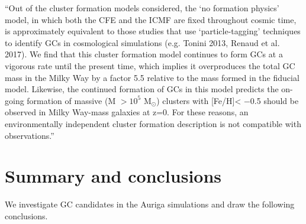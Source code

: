 \documentclass[a4paper,fleqn,usenatbib]{mnras}
\newcommand{\Sun}[0]{\ensuremath{_{\odot}}}
\begin{document}
%
%
%


\citep{2019MNRAS.486.5838R}
``Out of the cluster formation models considered, the `no formation physics' model,
in which both the CFE and the ICMF are fixed throughout cosmic time, is
approximately equivalent to those studies  that  use  `particle-tagging'
techniques  to  identify  GCs  in cosmological simulations (e.g. Tonini 2013,
Renaud et al. 2017). We find that this cluster formation model continues to form GCs
at a vigorous rate until the present time, which implies it overproduces
the total GC mass in the Milky Way by a factor
5.5 relative to the mass formed in the fiducial model. Likewise, the continued
formation  of  GCs  in  this  model  predicts  the  on-going  formation
of massive (M $>10^5$ M\Sun) clusters with [Fe/H]< −0.5 should be observed in
Milky Way-mass galaxies at z=0. For these reasons, an environmentally independent
cluster formation description is not compatible with observations.''



\section{Summary and conclusions}
\label{sec:conclusions}

We investigate GC candidates in the Auriga simulations and draw the following
conclusions.
\end{document}
